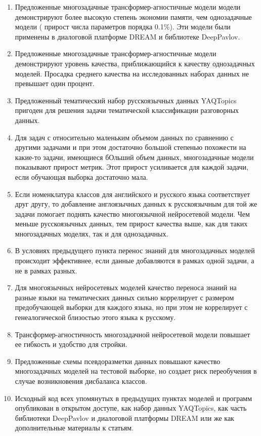 \begin{enumerate}
\item Предложенные многозадачные трансформер-агностичные модели модели демонстрируют более высокую степень экономии памяти, чем однозадачные модели ( прирост числа параметров порядка 0.1\%). Эти модели были применены в диалоговой платформе {DREAM} и библиотеке DeepPavlov.
\item Предложенные многозадачные трансформер-агностичные модели демонстрируют уровень качества, приближающийся к качеству однозадачных моделей. Просадка среднего качества на исследованных наборах данных не превышает один процент.
\item Предложенный тематический набор русскоязычных данных {YAQTopics} пригоден для решения задачи тематической классификации разговорных данных.
\item Для задач с относительно маленьким объемом данных по сравнению с другими задачами и при этом достаточно большой степенью похожести на какие-то задачи, имеющиеся бОльший объем данных, многозадачные модели показывают прирост метрик. Этот прирост усиливается для каждой задачи, если обучающая выборка достаточно мала.
\item Если номенклатура классов для английского и русского языка соответствует друг другу, то добавление англоязычных данных к русскоязычным для той же задачи помогает поднять качество многоязычной нейросетевой модели. Чем меньше русскоязычных данных, тем прирост качества выше, как для таких многозадачных моделях, так и для однозадачных.
\item В условиях предыдущего пункта перенос знаний для многозадачных моделей происходит эффективнее, если данные добавляются в рамках одной задачи, а не в рамках разных.
\item Для многоязычных нейросетевых моделей качество переноса знаний на разные языки на тематических данных сильно коррелирует с размером предобучающей выборки для каждого языка, но при этом не коррелирует с генеалогической близостью этого языка к русскому.
\item Трансформер-агностичность многозадачной нейросетевой модели повышает ее гибкость и удобство для стройки.
\item Предложенные схемы псевдоразметки данных повышают качество многозадачных моделей на тестовой выборке, но создает риск переобучения в случае возникновения дисбаланса классов.
  \item Исходный код всех упомянутых в предыдущих пунктах моделей и программ опубликован в открытом доступе, как набор данных YAQTopics, как часть библиотеки DeepPavlov и диалоговой платформы {DREAM} или же как дополнительные материалы к статьям.
\end{enumerate}
